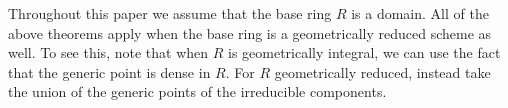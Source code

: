 \documentclass{amsart}
\begin{document}
\begin{remark}
Throughout this paper we assume that the base ring $R$ is a domain.
  All of the above theorems apply when the base ring is a geometrically reduced scheme as well. To see this, note that when $R$ is geometrically integral, we can use the fact that the generic point is dense in $R$. For $R$ geometrically reduced, instead take the union of the generic points of the irreducible components.
\end{remark}














%
\end{document}
